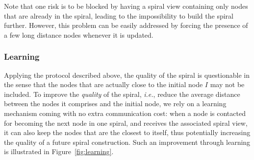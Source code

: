Note that one risk is to be blocked by having a spiral view containing only
nodes that are already in the spiral, leading to the impossibility to build the
spiral further. However, this problem can be easily addressed by forcing the
presence of a few long distance nodes whenever it is updated.


\subsubsection*{Learning}

Applying the protocol described above, the quality of the spiral is
questionable in the sense that the nodes that are actually close to the initial
node $I$ may not be included.%
%
To improve the \emph{quality} of the spiral, \emph{i.e.}, reduce the average
distance between the nodes it comprises and the initial node, we rely on a
learning mechanism coming with no extra communication cost: when a node is
contacted for becoming the next node in one spiral, and receives the associated
spiral view, it can also keep the nodes that are the closest to itself, thus
potentially increasing the quality of a future spiral construction. Such an
improvement through learning is illustrated in Figure~\ref{fig:learning}.


